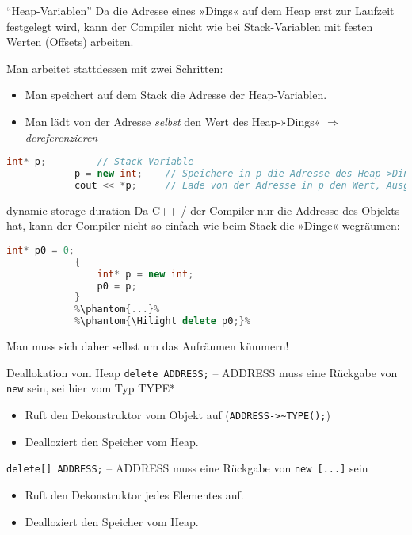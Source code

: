 \begin{frame}[fragile]{\enquote{Heap-Variablen}}
	Da die Adresse eines »Dings« auf dem Heap erst zur Laufzeit festgelegt wird, kann der Compiler nicht wie bei Stack-Variablen mit festen Werten (Offsets) arbeiten.
	
	\hspace{1em}
	\pause
	
	Man arbeitet stattdessen mit zwei Schritten:
	\begin{itemize}
		\item Man speichert auf dem Stack die Adresse der Heap-Variablen.
		\item Man lädt von der Adresse \emph{selbst} den Wert des Heap-»Dings« $\Rightarrow$ \emph{dereferenzieren}
	\end{itemize}
	\pause
	
	\footnotesize
	\begin{block}{}
		\begin{lstlisting}[language=C++]
			int* p;         // Stack-Variable
			p = new int;    // Speichere in p die Adresse des Heap->Dings<.
			cout << *p;     // Lade von der Adresse in p den Wert, Ausgabe.
		\end{lstlisting}
	\end{block}
\end{frame}

\begin{frame}[fragile]{dynamic storage duration}
	Da C++ / der Compiler nur die Addresse des Objekts hat, kann der Compiler nicht so einfach wie beim Stack die »Dinge« wegräumen:
	
	{\footnotesize
	\begin{block}{}
		\begin{lstlisting}[language=C++, escapechar=\%]
			int* p0 = 0;
			{
			    int* p = new int;
			    p0 = p;
			}
			%\phantom{...}%
			%\phantom{\Hilight delete p0;}%
		\end{lstlisting}
	\end{block}
	}
	
	Man muss sich daher selbst um das Aufräumen kümmern!
\end{frame}

\begin{frame}[fragile]{Deallokation vom Heap}
	\verb|delete ADDRESS;| -- ADDRESS muss eine Rückgabe von \verb|new| sein, sei hier vom Typ TYPE*
	\begin{itemize}
		\item Ruft den Dekonstruktor vom Objekt auf (\verb|ADDRESS->~TYPE();|)
		\item Dealloziert den Speicher vom Heap.
	\end{itemize}
	
	\vspace{2em}
	
	\verb|delete[] ADDRESS;| -- ADDRESS muss eine Rückgabe von \verb|new [...]| sein
	\begin{itemize}
		\item Ruft den Dekonstruktor jedes Elementes auf.
		\item Dealloziert den Speicher vom Heap.
	\end{itemize}
\end{frame}

